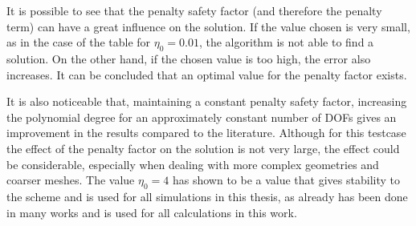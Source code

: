 It is possible to see that the penalty safety factor (and therefore the penalty term) can have a great influence on the solution. If the value chosen is very small, as in the case of the table for $\eta_0 = 0.01$, the algorithm is not able to find a solution. On the other hand, if the chosen value is too high, the error also increases. It can be concluded that an optimal value for the penalty factor exists.

It is also noticeable that, maintaining a constant penalty safety factor, increasing the polynomial degree for an approximately constant number of DOFs gives an improvement in the results compared to the literature. Although for this testcase the effect of the penalty factor on the solution is not very large, the effect could be considerable, especially when dealing with more complex geometries and coarser meshes. The value $\eta_0 = 4$ has shown to be a value that gives stability to the scheme and is used for all simulations in this thesis, as already has been done in many works \parencite{krauseIncompressibleImmersedBoundary2017,kummerExtendedDiscontinuousGalerkin2017,smudamartinDirectNumericalSimulation2021} and is used for all calculations in this work.
 

